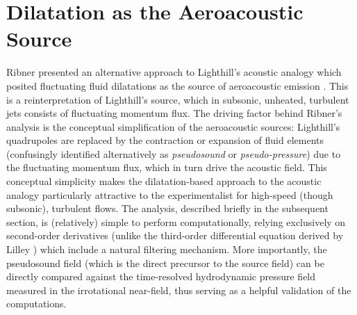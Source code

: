 \chapter{Dilatation as the Aeroacoustic Source}
\label{sect:source}
Ribner presented an alternative approach to Lighthill's acoustic analogy which posited fluctuating fluid dilatations as the source of aeroacoustic emission \citep{Ribner1962}.
This is a reinterpretation of Lighthill's source, which in subsonic, unheated, turbulent jets consists of fluctuating momentum flux.
The driving factor behind Ribner's analysis is the conceptual simplification of the aeroacoustic sources: Lighthill's quadrupoles are replaced by the contraction or expansion of fluid elements (confusingly identified alternatively as \emph{pseudosound} or \emph{pseudo-pressure}) due to the fluctuating momentum flux, which in turn drive the acoustic field.
This conceptual simplicity makes the dilatation-based approach to the acoustic analogy particularly attractive to the experimentalist for high-speed (though subsonic), turbulent flows.
The analysis, described briefly in the subsequent section, is (relatively) simple to perform computationally, relying exclusively on second-order derivatives (unlike the third-order differential equation derived by Lilley \citep{Lilley2003}) which include a natural filtering mechanism.
More importantly, the pseudosound field (which is the direct precursor to the source field) can be directly compared against the time-resolved hydrodynamic pressure field measured in the irrotational near-field, thus serving as a helpful validation of the computations.

